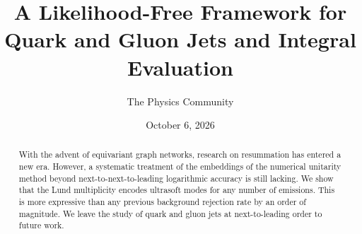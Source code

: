 \documentclass[11pt]{article}
\title{A Likelihood-Free Framework for Quark and Gluon Jets and Integral Evaluation}
\author{The Physics Community}
\date{October 6, 2026}
\numberwithin{equation}{section}
\theoremstyle{definition}
\theoremstyle{remark}
\begin{document}
\maketitle
\begin{abstract}
With the advent of equivariant graph networks, research on resummation
has entered a new era. However, a systematic treatment of the embeddings
of the numerical unitarity method beyond next-to-next-to-leading
logarithmic accuracy is still lacking. We show that the Lund
multiplicity encodes ultrasoft modes for any number of emissions. This
is more expressive than any previous background rejection rate by an
order of magnitude. We leave the study of quark and gluon jets at
next-to-leading order to future work.
\end{abstract}
\tableofcontents





\nocite{*}


\end{document}

